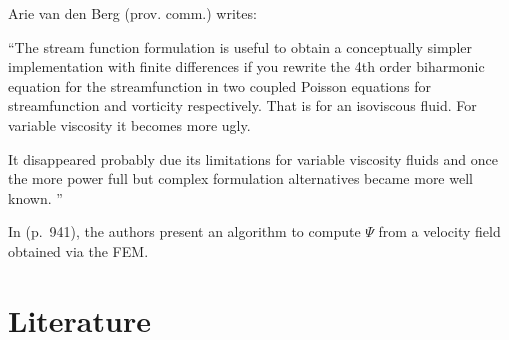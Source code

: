 Arie van den Berg (prov. comm.) writes:
\begin{displayquote}
{\color{darkgray}
``The stream function formulation is useful to obtain a conceptually
simpler implementation with finite differences if you rewrite the 4th
order biharmonic equation for the streamfunction in two coupled Poisson
equations for streamfunction and vorticity respectively. That is for an
isoviscous fluid. For variable viscosity it becomes more ugly.

It disappeared probably due its limitations for variable viscosity fluids
and once the more power full  but complex formulation alternatives
became more well known. ''
}
\end{displayquote}

In \textcite{grsa} (p.~941), the authors present an algorithm to compute $\Psi$
from a velocity field obtained via the FEM. 


















\section{Literature}



